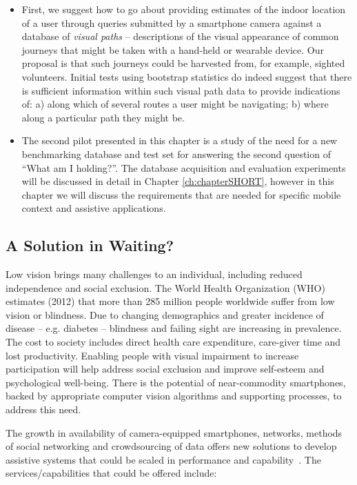 \begin{itemize}
\item First, we suggest how to go about providing estimates of the indoor location of a user through queries submitted by a smartphone camera against a database of {\em visual paths} -- descriptions of the visual appearance of common journeys that might be taken with a hand-held or wearable device. Our proposal is that such journeys could be harvested from, for example, sighted volunteers. Initial tests using bootstrap statistics do indeed suggest that there is sufficient information within such visual path data to provide indications of: a) along which of several routes a user might be navigating; b) where along a particular path they might be.
\item The second pilot presented in this chapter is a study of the need for a new benchmarking database and test set for answering the second question of ``What am I holding?''. The database acquisition and evaluation experiments will be discussed in detail in Chapter \ref{ch:chapterSHORT}, however in this chapter we will discuss the requirements that are needed for specific mobile context and assistive applications.
\end{itemize}


\subsection{A Solution in Waiting?}

Low vision brings many challenges to an individual, including reduced independence and social exclusion. The World Health Organization (WHO) estimates (2012) that more than 285 million people worldwide suffer from low vision or blindness. Due to changing demographics and greater incidence of disease -- e.g. diabetes -- blindness and failing sight are increasing in prevalence.  The cost to society includes direct health care expenditure, care-giver time and lost productivity.  Enabling people with visual impairment to increase participation will help address social exclusion and improve self-esteem and psychological well-being. There is the potential of near-commodity smartphones, backed by appropriate computer vision algorithms and supporting processes, to address this need.


The growth in availability of camera-equipped smartphones, networks, methods of social networking and crowdsourcing of data offers new solutions to develop assistive systems that could be scaled in performance and capability~\cite{Manduchi2012,Worsfold2010}. The services/capabilities that could be offered include:

